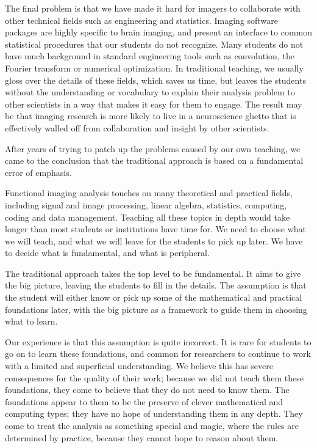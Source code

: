 The final problem is that we have made it hard for imagers to collaborate with
other technical fields such as engineering and statistics.  Imaging software
packages are highly specific to brain imaging, and present an interface to
common statistical procedures that our students do not recognize.  Many
students do not have much background in standard engineering tools such as
convolution, the Fourier transform or numerical optimization.  In traditional
teaching, we usually gloss over the details of these fields, which saves us
time, but leaves the students without the understanding or vocabulary to
explain their analysis problem to other scientists in a way that makes it easy
for them to engage.  The result may be that imaging research is more likely to
live in a neuroscience ghetto that is effectively walled off from
collaboration and insight by other scientists.

After years of trying to patch up the problems caused by our own teaching, we
came to the conclusion that the traditional approach is based on a fundamental
error of emphasis.

Functional imaging analysis touches on many theoretical and practical fields,
including signal and image processing, linear algebra, statistics, computing,
coding and data management.  Teaching all these topics in depth would take
longer than most students or institutions have time for.  We need to choose
what we will teach, and what we will leave for the students to pick up later.
We have to decide what is fundamental, and what is peripheral.

The traditional approach takes the top level to be fundamental.  It aims to
give the big picture, leaving the students to fill in the details. The
assumption is that the student will either know or pick up some of the
mathematical and practical foundations later, with the big picture as a
framework to guide them in choosing what to learn.

Our experience is that this assumption is quite incorrect.  It is rare for
students to go on to learn these foundations, and common for researchers to
continue to work with a limited and superficial understanding.  We believe
this has severe consequences for the quality of their work; because we did not
teach them these foundations, they come to believe that they do not need to
know them.  The foundations appear to them to be the preserve of clever
mathematical and computing types; they have no hope of understanding them in
any depth.  They come to treat the analysis as something special and magic,
where the rules are determined by practice, because they cannot hope to reason
about them.

